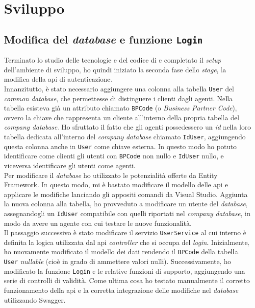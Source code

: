 \section{Sviluppo}
\subsection{Modifica del \textit{database} e funzione \texttt{Login}}
Terminato lo studio delle tecnologie e del codice di {\movi} e completato il \textit{setup} dell'ambiente di 
sviluppo, ho quindi iniziato la seconda fase dello \textit{stage}, la modifica della \gls{api} di autenticazione.\\
Innanzitutto, è stato necessario aggiungere una colonna alla tabella \texttt{User} del \textit{common database}, 
che permettesse di distinguere i clienti dagli agenti. 
Nella tabella esisteva già un attributo chiamato \texttt{BPCode} (o \textit{Business Partner Code}), ovvero la chiave 
che rappresenta un cliente all'interno della propria tabella del \textit{company database}.
Ho sfruttato il fatto che gli agenti possedessero un 
\textit{id} nella loro tabella dedicata all'interno del \textit{company database} chiamato \texttt{IdUser}, 
aggiungendo questa colonna anche in \texttt{User} come chiave esterna. In questo modo ho potuto identificare come clienti 
gli utenti con \texttt{BPCode} non nullo e \texttt{IdUser} nullo, e viceversa identificare gli utenti come 
agenti.\\
Per modificare il \textit{database} ho utilizzato le potenzialità offerte da Entity Framework. In questo modo, 
mi è bastato modificare il modello delle \gls{api} e applicare le modifiche lanciando gli appositi comandi da Visual 
Studio. Aggiunta la nuova colonna alla tabella, ho provveduto a modificare un utente del \textit{database}, 
assegnandogli un \texttt{IdUser} compatibile con quelli riportati nel \textit{company database}, in modo da avere un agente 
con cui testare le nuove funzionalità.\\
Il passaggio successivo è stato modificare il servizio \texttt{UserService} al cui interno è definita la logica utilizzata 
dal \gls{api} \textit{controller} che si occupa del \textit{login}.
Inizialmente, ho nuovamente modificato il modello dei dati rendendo il \texttt{BPCode} della tabella \texttt{User} 
\textit{nullable} (cioè in grado di ammettere valori nulli). Successivamente, ho modificato la funzione \texttt{Login} e 
le relative funzioni 
di supporto, aggiungendo una serie di controlli di validità. Come ultima cosa ho testato manualmente il corretto funzionamento 
della \gls{api} e la corretta integrazione delle modifiche nel \textit{database} utilizzando Swagger.

